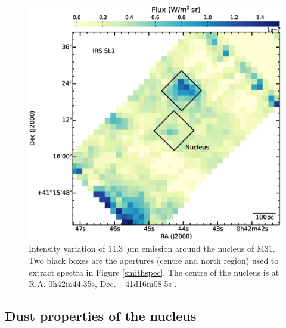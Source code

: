\begin{figure}
\centering
\includegraphics[width = 8 cm]{./nuc11_3.eps}
\caption{ Intensity variation of 11.3~$\mu$m emission around the nucleus of M31. 
Two black boxes are the apertures (centre and north region) used to extract spectra in Figure \ref{smithspec}. 
The centre of the nucleus is at R.A. 0h42m44.35s, Dec. +41d16m08.5s \citep{NucleusREF}.}
\label{nuc11}
\end{figure}

\subsection{Dust properties of the nucleus}
\label{sect:nucleus}

%
%
%

